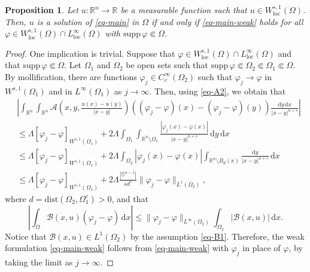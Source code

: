 \documentclass{amsart}
\theoremstyle{plain}
\newtheorem{proposition}[theorem]{Proposition}
\theoremstyle{definition}
\numberwithin{equation}{section}
\begin{document}
\begin{proposition}\label{prop-test}
Let $u: \mathbb{R}^n \to \mathbb{R}$ be a measurable function such that $u \in W^{s, 1}_{\mathrm{loc}}(\Omega)$. Then, $u$ is a solution of \eqref{eq-main} in $\Omega$ if and only if \eqref{eq-main-weak} holds for all $\varphi \in W^{s, 1}_{\mathrm{loc}}(\Omega) \cap L^\infty_{\mathrm{loc}}(\Omega)$ with $\mathrm{supp}\,\varphi \Subset \Omega$.
\end{proposition}

\begin{proof}
One implication is trivial. Suppose that $\varphi \in W^{s, 1}_{\mathrm{loc}}(\Omega) \cap L^\infty_{\mathrm{loc}}(\Omega)$ and that $\mathrm{supp}\,\varphi \Subset \Omega$. Let $\Omega_1$ and $\Omega_2$ be open sets such that $\mathrm{supp}\,\varphi \Subset \Omega_2 \Subset \Omega_1 \Subset \Omega$. By mollification, there are functions $\varphi_j \in C^\infty_c(\Omega_2)$ such that $\varphi_j \to \varphi$ in $W^{s, 1}(\Omega_1)$ and in $L^\infty(\Omega_1)$ as $j \to \infty$. Then, using \eqref{eq-A2}, we obtain that
\begin{align*}
&\left| \int_{\mathbb{R}^n} \int_{\mathbb{R}^n} \mathscr{A} \left( x, y, \frac{u(x)-u(y)}{|x-y|} \right) ((\varphi_j-\varphi)(x)-(\varphi_j-\varphi)(y)) \frac{\mathrm{d}y \,\mathrm{d}x}{|x-y|^{n+s}} \right| \\
&\leq \Lambda [\varphi_j-\varphi]_{W^{s, 1}(\Omega_1)} + 2\Lambda \int_{\Omega_1} \int_{\mathbb{R}^n \setminus \Omega_1} \frac{|\varphi_j(x)-\varphi(x)|}{|x-y|^{n+s}} \,\mathrm{d}y \,\mathrm{d}x \\
&\leq \Lambda [\varphi_j-\varphi]_{W^{s, 1}(\Omega_1)} + 2\Lambda \int_{\Omega_2} |\varphi_j(x)-\varphi(x)| \int_{\mathbb{R}^n \setminus B_d(x)} \frac{\mathrm{d}y}{|x-y|^{n+s}} \,\mathrm{d}x \\
&\leq \Lambda [\varphi_j-\varphi]_{W^{s, 1}(\Omega_1)} + 2\Lambda \frac{|\mathbb{S}^{n-1}|}{sd^s} \|\varphi_j-\varphi\|_{L^1(\Omega_2)},
\end{align*}
where $d=\mathrm{dist}(\Omega_2, \Omega_1^c)>0$, and that
\begin{equation*}
\left| \int_{\Omega} \mathscr{B}(x, u)(\varphi_j-\varphi) \,\mathrm{d}x \right| \leq \|\varphi_j-\varphi\|_{L^\infty(\Omega_2)} \int_{\Omega_2} |\mathscr{B}(x, u)| \,\mathrm{d}x.
\end{equation*}
Notice that $\mathscr{B}(x, u) \in L^1(\Omega_2)$ by the assumption \eqref{eq-B1}. Therefore, the weak formulation \eqref{eq-main-weak} follows from \eqref{eq-main-weak} with $\varphi_j$ in place of $\varphi$, by taking the limit as $j \to \infty$.
\end{proof}
\end{document}
